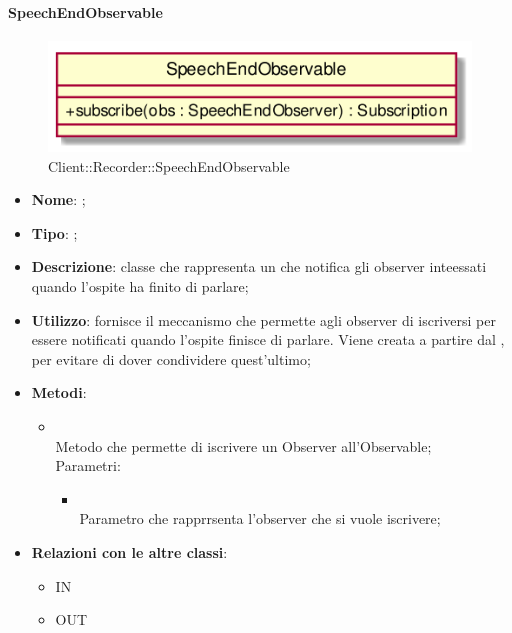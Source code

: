 \hypertarget{SpeechEndObservable_label}{\paragraph{SpeechEndObservable}}
\begin{figure}[h]
	\centering
	\includegraphics[width=\textwidth,height=\textheight,keepaspectratio]{images/ClassSpeechEndObservable.png}
	\caption{Client::Recorder::SpeechEndObservable}
\end{figure}
\begin{itemize}
	\item \textbf{Nome}: ;
	\item \textbf{Tipo}: ;
	\item \textbf{Descrizione}: classe che rappresenta un  che notifica gli observer inteessati quando l'ospite ha finito di parlare;
	\item \textbf{Utilizzo}: fornisce il meccanismo che permette agli observer di iscriversi per essere notificati quando l'ospite finisce di parlare. Viene creata a partire dal , per evitare di dover condividere quest'ultimo;
	\item \textbf{Metodi}:
	\begin{itemize}
		\item[]  \\
		Metodo che permette di iscrivere un Observer all'Observable;\\
		Parametri:
		\begin{itemize}
			\item {} \\
			Parametro che rapprrsenta l'observer che si vuole iscrivere;
		\end{itemize}
	\end{itemize}
	\item \textbf{Relazioni con le altre classi}:
	\begin{itemize}
		\item IN \hyperlink{LogicObserver_label}{}
		\item OUT \hyperlink{SpeechEndSubject_label}{}
	\end{itemize}
\end{itemize}
\FloatBarrier

